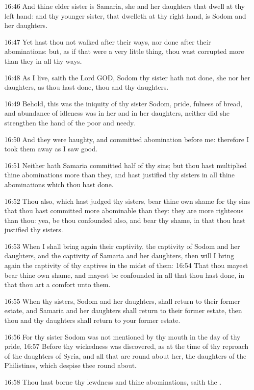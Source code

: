 16:46 And thine elder sister is Samaria, she and her daughters that
dwell at thy left hand: and thy younger sister, that dwelleth at thy
right hand, is Sodom and her daughters.

16:47 Yet hast thou not walked after their ways, nor done after their
abominations: but, as if that were a very little thing, thou wast
corrupted more than they in all thy ways.

16:48 As I live, saith the Lord GOD, Sodom thy sister hath not done,
she nor her daughters, as thou hast done, thou and thy daughters.

16:49 Behold, this was the iniquity of thy sister Sodom, pride,
fulness of bread, and abundance of idleness was in her and in her
daughters, neither did she strengthen the hand of the poor and needy.

16:50 And they were haughty, and committed abomination before me:
therefore I took them away as I saw good.

16:51 Neither hath Samaria committed half of thy sins; but thou hast
multiplied thine abominations more than they, and hast justified thy
sisters in all thine abominations which thou hast done.

16:52 Thou also, which hast judged thy sisters, bear thine own shame
for thy sins that thou hast committed more abominable than they: they
are more righteous than thou: yea, be thou confounded also, and bear
thy shame, in that thou hast justified thy sisters.

16:53 When I shall bring again their captivity, the captivity of Sodom
and her daughters, and the captivity of Samaria and her daughters,
then will I bring again the captivity of thy captives in the midst of
them: 16:54 That thou mayest bear thine own shame, and mayest be
confounded in all that thou hast done, in that thou art a comfort unto
them.

16:55 When thy sisters, Sodom and her daughters, shall return to their
former estate, and Samaria and her daughters shall return to their
former estate, then thou and thy daughters shall return to your former
estate.

16:56 For thy sister Sodom was not mentioned by thy mouth in the day
of thy pride, 16:57 Before thy wickedness was discovered, as at the
time of thy reproach of the daughters of Syria, and all that are round
about her, the daughters of the Philistines, which despise thee round
about.

16:58 Thou hast borne thy lewdness and thine abominations, saith the
\LORD.

